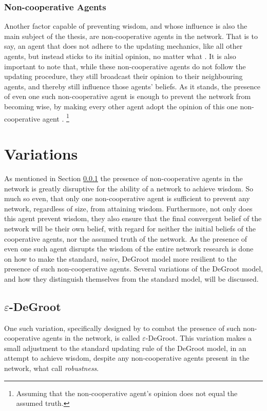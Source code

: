 \documentclass[a4paper, 12pt]{report}
\begin{document}
\subsubsection{Non-cooperative Agents}
\label{theory:noncoop}

Another factor capable of preventing wisdom, and whose influence is also the main subject of the thesis, are non-cooperative agents in the network. That is to say, an agent that does not adhere to the updating mechanics, like all other agents, but instead sticks to its initial opinion, no matter what \parencite{amir2021robust}. It is also important to note that, while these non-cooperative agents do not follow the updating procedure, they still broadcast their opinion to their neighbouring agents, and thereby still influence those agents' beliefs. 
As it stands, the presence of even one such non-cooperative agent is enough to prevent the network from becoming wise, by making every other agent adopt the opinion of this one non-cooperative agent \parencite{amir2021robust}. \footnote{Assuming that the non-cooperative agent's opinion does not equal the assumed truth.}



\section{Variations}
\label{updating:variations}
As mentioned in Section \ref{theory:noncoop} the presence of non-cooperative agents in the network is greatly disruptive for the ability of a network to achieve wisdom. So much so even, that only one non-cooperative agent is sufficient to prevent any network, regardless of size, from attaining wisdom. Furthermore, not only does this agent prevent wisdom, they also ensure that the final convergent belief of the network will be their own belief, with regard for neither the initial beliefs of the cooperative agents, nor the assumed truth of the network. As the presence of even one such agent disrupts the wisdom of the entire network research is done on how to make the standard, \emph{naive}, DeGroot model more resilient to the presence of such non-cooperative agents. Several variations of the DeGroot model, and how they distinguish themselves from the standard model, will be discussed.

\subsection{$\varepsilon$-DeGroot}
\label{updating:epsilon}
One such variation, specifically designed by \cite{amir2021robust} to combat the presence of such non-cooperative agents in the network, is called $\varepsilon$-DeGroot. This variation makes a small adjustment to the standard updating rule of the DeGroot model, in an attempt to achieve wisdom, despite any non-cooperative agents present in the network, what \cite{amir2021robust} call \emph{robustness}.
\end{document}
